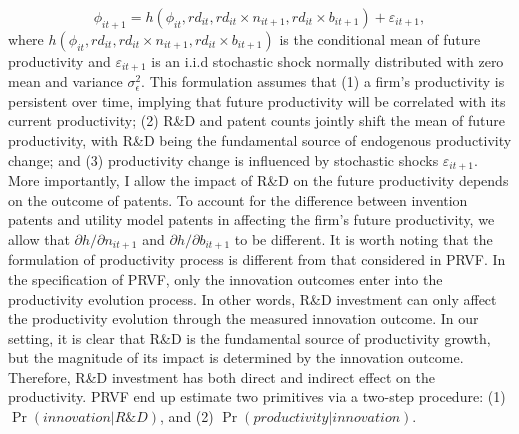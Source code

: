 \documentclass[11pt]{article}
\begin{document}
\begin{equation}
    \phi_{it+1} = h(\phi_{it}, rd_{it}, rd_{it}\times n_{it+1}, rd_{it}\times b_{it+1}) + \varepsilon_{it+1},
\end{equation}
where $h(\phi_{it}, rd_{it}, rd_{it}\times n_{it+1}, rd_{it}\times b_{it+1})$ is the conditional mean of future productivity and $\varepsilon_{it+1}$ is an i.i.d stochastic shock normally distributed with zero mean and variance $\sigma_{\epsilon}^2$. This
formulation assumes that (1) a firm’s productivity is persistent over time, implying that future productivity will be correlated with its current productivity; (2) R\&D and patent counts jointly shift the mean of future productivity, with R\&D being the fundamental source of endogenous productivity change; and (3) productivity change is influenced by stochastic shocks $\varepsilon_{it+1}$. More importantly, I allow the impact of R\&D on the future productivity depends on the outcome of patents. To account for the difference between invention patents
and utility model patents in affecting the firm’s future productivity, we allow that $\partial h/\partial n_{it+1}$ and $\partial h/\partial b_{it+1}$ to be different. It is worth noting that the formulation of productivity process is different from that considered in PRVF. In the specification of PRVF, only the innovation outcomes enter into the productivity evolution process. In other words, R\&D investment can only affect the productivity evolution through the measured innovation outcome. In our setting, it is clear that R\&D is the fundamental source of productivity growth, but the magnitude of its impact is determined by the innovation outcome. Therefore, R\&D investment has both direct and indirect effect on the productivity. PRVF end up estimate two primitives via a two-step procedure: (1) $\Pr(innovation| R\&D)$, and (2) $\Pr(productivity|innovation)$. 
\end{document}
